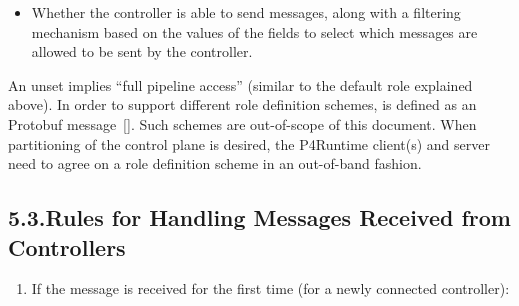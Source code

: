 \documentclass[11pt]{article}
\begin{document}
{\begin{itemize}[noitemsep,topsep=\mdcompacttopsep]
\item{}Whether the controller is able to send  messages, along with a
filtering mechanism based on the values of the  fields to
select which  messages are allowed to be sent by the controller.%
\end{itemize}%

\noindent{}An unset  implies \textquotedblleft{}full pipeline access\textquotedblright{} (similar to the default
role explained above). In order to support different role definition schemes,
 is defined as an  Protobuf message~[]. Such schemes
are out-of-scope of this document. When partitioning of the control plane is
desired, the P4Runtime client(s) and server need to agree on a role definition
scheme in an out-of-band fashion.%

\subsection{5.3.\hspace*{0.5em}Rules for Handling  Messages Received from Controllers}\label{sec-rules-for-handling-masterarbitrationupdate-messages-received-from-controllers}%

\begin{enumerate}%

\item{}
If the  message is received for the first time (for
a newly connected controller):%

\begin{enumerate}%


\end{enumerate}
\end{enumerate}}
\end{document}
